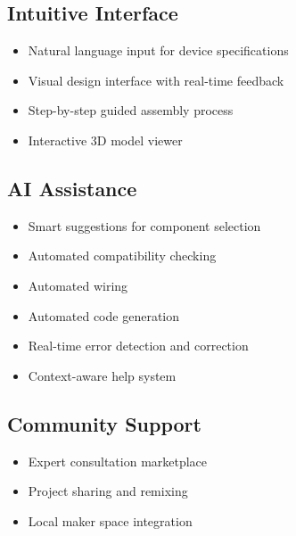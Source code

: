 \subsection{Intuitive Interface}
\begin{itemize}[leftmargin=*]
    \item Natural language input for device specifications
    \item Visual design interface with real-time feedback
    \item Step-by-step guided assembly process
    \item Interactive 3D model viewer
\end{itemize}

\subsection{AI Assistance}
\begin{itemize}[leftmargin=*]
    \item Smart suggestions for component selection
    \item Automated compatibility checking
    \item Automated wiring
    \item Automated code generation
    \item Real-time error detection and correction
    \item Context-aware help system
\end{itemize}

\subsection{Community Support}
\begin{itemize}[leftmargin=*]
    \item Expert consultation marketplace
    \item Project sharing and remixing
    \item Local maker space integration
\end{itemize} 